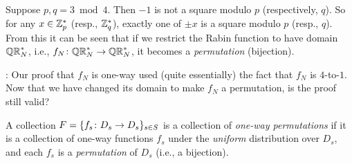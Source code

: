 \documentclass[11pt]{article}
\begin{document}
Suppose $p,q = 3 \bmod 4$.  Then $-1$ is not a square modulo $p$
(respectively, $q$).  So for any $x \in \mathbb{Z}_p^{*}$ (resp., $\mathbb{Z}_q^{*}$),
exactly one of $\pm x$ is a square modulo $p$ (resp., $q$).  From this
it can be seen that if we restrict the Rabin function to have domain
$\mathbb{QR}_{N}^{*}$, i.e., $f_{N} \colon \mathbb{QR}_{N}^{*} \to \mathbb{QR}_{N}^{*}$, it becomes a
\emph{permutation} (bijection).

\medskip
{}: Our proof that $f_{N}$ is one-way used
(quite essentially) the fact that $f_{N}$ is $4$-to-$1$.  Now that we
have changed its domain to make $f_{N}$ a permutation, is the proof
still valid?

\begin{definition}
  A collection $F = \{f_{s} \colon D_{s} \to D_{s}\}_{s \in S}$ is a
  collection of \emph{one-way permutations} if it is a collection of
  one-way functions $f_{s}$ under the \emph{uniform} distribution over
  $D_{s}$, and each $f_{s}$ is a \emph{permutation} of $D_{s}$ (i.e.,
  a bijection).
\end{definition}
\end{document}
